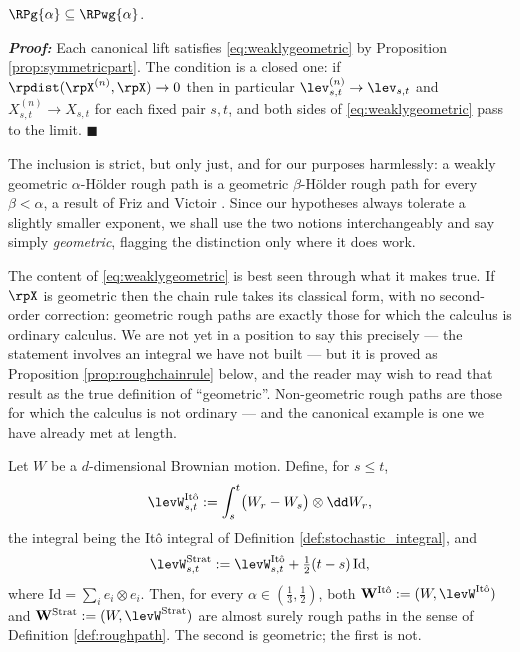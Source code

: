 \begin{proposition}\label{prop:geometricinclusion}
$\RPg{\alpha} \subseteq \RPwg{\alpha}$.
\end{proposition}

\textbf{\textit{Proof:}} Each canonical lift satisfies \eqref{eq:weaklygeometric} by Proposition
\ref{prop:symmetricpart}. The condition is a closed one: if $\rpdist(\rpX^{(n)},\rpX)\to0$ then in
particular $\lev^{(n)}_{s,t}\to\lev_{s,t}$ and $X^{(n)}_{s,t}\to X_{s,t}$ for each fixed pair $s,t$,
and both sides of \eqref{eq:weaklygeometric} pass to the limit. \hfill $\blacksquare$

\medskip

The inclusion is strict, but only just, and for our purposes harmlessly: a weakly geometric
$\alpha$-Hölder rough path is a geometric $\beta$-Hölder rough path for every $\beta<\alpha$, a
result of Friz and Victoir \cite[Ch.\ 8]{frizvictoir2010}. Since our hypotheses always tolerate a
slightly smaller exponent, we shall use the two notions interchangeably and say simply
\emph{geometric}, flagging the distinction only where it does work.

The content of \eqref{eq:weaklygeometric} is best seen through what it makes true. If $\rpX$ is
geometric then the chain rule takes its classical form, with no second-order correction: geometric
rough paths are exactly those for which the calculus is ordinary calculus. We are not yet in a
position to say this precisely --- the statement involves an integral we have not built --- but it
is proved as Proposition \ref{prop:roughchainrule} below, and the reader may wish to read that
result as the true definition of ``geometric''. Non-geometric rough paths are those for which the
calculus is not ordinary --- and the canonical example is one we have already met at length.

\begin{example}\label{ex:brownianroughpath}
Let $W$ be a $d$-dimensional Brownian motion. Define, for $s\leq t$,
\begin{equation}\label{eq:itolift}
\levW^{\mathrm{It\hat o}}_{s,t} := \int_s^t \bigl(W_r - W_s\bigr)\otimes \dd W_r ,
\end{equation}
the integral being the Itô integral of Definition \ref{def:stochastic_integral}, and
\begin{equation}\label{eq:stratlift}
\levW^{\mathrm{Strat}}_{s,t} := \levW^{\mathrm{It\hat o}}_{s,t} + \tfrac12 (t-s)\,\mathrm{Id},
\end{equation}
where $\mathrm{Id} = \sum_i e_i \otimes e_i$. Then, for every $\alpha \in (\tfrac13,\tfrac12)$, both
$\mathbf{W}^{\mathrm{It\hat o}} := (W,\levW^{\mathrm{It\hat o}})$ and
$\mathbf{W}^{\mathrm{Strat}} := (W,\levW^{\mathrm{Strat}})$ are almost surely rough paths in the
sense of Definition \ref{def:roughpath}. The second is geometric; the first is not.
\end{example}

